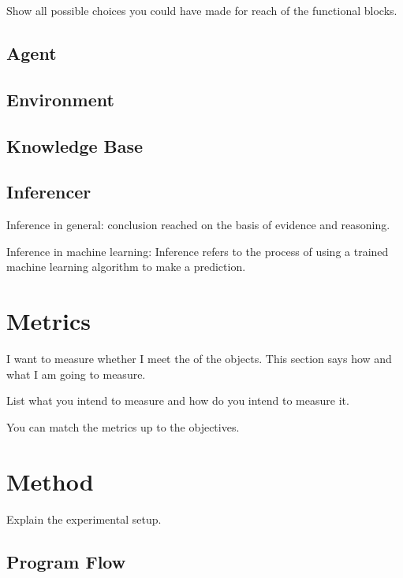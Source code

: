Show all possible choices you could have made for reach of the functional blocks.

\subsection{Agent}
		
	
\subsection{Environment}



\subsection{Knowledge Base}



\subsection{Inferencer}

Inference in general: conclusion reached on the basis of evidence and reasoning.

Inference in machine learning: Inference refers to the process of using a trained machine learning algorithm to make a prediction.

\section{Metrics}

I want to measure whether I meet the of the objects.
This section says how and what I am going to measure.

List what you intend to measure and how do you intend to measure it.

You can match the metrics up to the objectives.

\section{Method}

Explain the experimental setup.
\subsection{Program Flow}